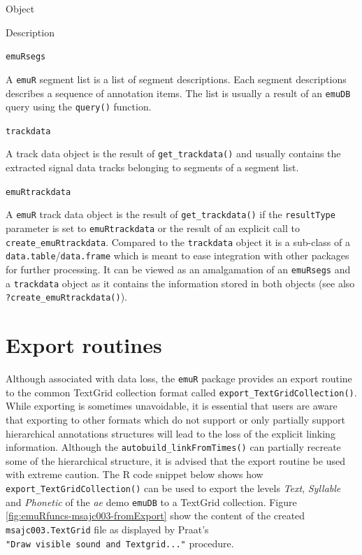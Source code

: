 \documentclass[]{book}
\begin{document}
Object

Description

\texttt{emuRsegs}

A \texttt{emuR} segment list is a list of segment descriptions. Each segment descriptions describes a sequence of annotation items. The list is usually a result of an \texttt{emuDB} query using the \texttt{query()} function.

\texttt{trackdata}

A track data object is the result of \texttt{get\_trackdata()} and usually contains the extracted signal data tracks belonging to segments of a segment list.

\texttt{emuRtrackdata}

A \texttt{emuR} track data object is the result of \texttt{get\_trackdata()} if the \texttt{resultType} parameter is set to \texttt{emuRtrackdata} or the result of an explicit call to \texttt{create\_emuRtrackdata}. Compared to the \texttt{trackdata} object it is a sub-class of a \texttt{data.table}/\texttt{data.frame} which is meant to ease integration with other packages for further processing. It can be viewed as an amalgamation of an \texttt{emuRsegs} and a \texttt{trackdata} object as it contains the information stored in both objects (see also \texttt{?create\_emuRtrackdata()}).

\hypertarget{sec:emuRpackageDetails-exportRoutines}{%
\section{Export routines}\label{sec:emuRpackageDetails-exportRoutines}}

Although associated with data loss, the \texttt{emuR} package provides an export routine to the common TextGrid collection format called \texttt{export\_TextGridCollection()}. While exporting is sometimes unavoidable, it is essential that users are aware that exporting to other formats which do not support or only partially support hierarchical annotations structures will lead to the loss of the explicit linking information. Although the \texttt{autobuild\_linkFromTimes()} can partially recreate some of the hierarchical structure, it is advised that the export routine be used with extreme caution. The R code snippet below shows how \texttt{export\_TextGridCollection()} can be used to export the levels \emph{Text}, \emph{Syllable} and \emph{Phonetic} of the \emph{ae} demo \texttt{emuDB} to a TextGrid collection. Figure \ref{fig:emuRfuncs-msajc003-fromExport} show the content of the created \texttt{msajc003.TextGrid} file as displayed by Praat's \texttt{"Draw\ visible\ sound\ and\ Textgrid..."} procedure.
\end{document}
